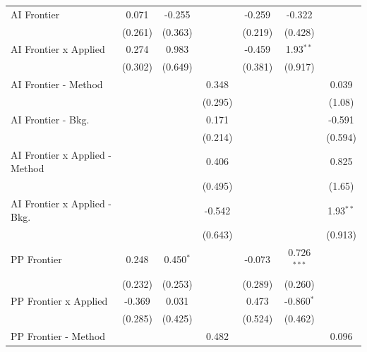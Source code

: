 \begin{tabular}{lcccccc}
   AI Frontier                    & 0.071   & -0.255      &             & -0.259       & -0.322        &   \\   
                                  & (0.261) & (0.363)     &             & (0.219)      & (0.428)       &   \\   
   AI Frontier x Applied          & 0.274   & 0.983       &             & -0.459       & 1.93$^{**}$   &   \\   
                                  & (0.302) & (0.649)     &             & (0.381)      & (0.917)       &   \\   
   AI Frontier - Method           &         &             & 0.348       &              &               & 0.039\\   
                                  &         &             & (0.295)     &              &               & (1.08)\\   
   AI Frontier - Bkg.             &         &             & 0.171       &              &               & -0.591\\   
                                  &         &             & (0.214)     &              &               & (0.594)\\   
   AI Frontier x Applied - Method &         &             & 0.406       &              &               & 0.825\\   
                                  &         &             & (0.495)     &              &               & (1.65)\\   
   AI Frontier x Applied - Bkg.   &         &             & -0.542      &              &               & 1.93$^{**}$\\   
                                  &         &             & (0.643)     &              &               & (0.913)\\   
   PP Frontier                    & 0.248   & 0.450$^{*}$ &             & -0.073       & 0.726$^{***}$ &   \\   
                                  & (0.232) & (0.253)     &             & (0.289)      & (0.260)       &   \\   
   PP Frontier x Applied          & -0.369  & 0.031       &             & 0.473        & -0.860$^{*}$  &   \\   
                                  & (0.285) & (0.425)     &             & (0.524)      & (0.462)       &   \\   
   PP Frontier - Method           &         &             & 0.482       &              &               & 0.096\\   

\end{tabular}
